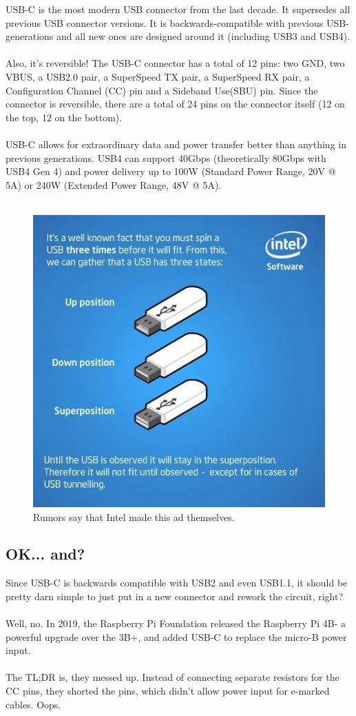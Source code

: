 \documentclass[12pt]{article}
\begin{document}
USB-C is the most modern USB connector from the last decade. It supersedes all previous USB connector versions. It is backwards-compatible with previous USB-generations and all new ones are designed around it (including USB3 and USB4). \\\\
\noindent
Also, it's reversible! The USB-C connector has a total of 12 pins: two GND, two VBUS, a USB2.0 pair, a SuperSpeed TX pair, a SuperSpeed RX pair, a Configuration Channel (CC) pin and a Sideband Use(SBU) pin. Since the connector is reversible, there are a total of 24 pins on the connector itself (12 on the top, 12 on the bottom). \\\\
\noindent
USB-C allows for extraordinary data and power transfer better than anything in previous generations. USB4 can support 40Gbps (theoretically 80Gbps with USB4 Gen 4) and power delivery up to 100W (Standard Power Range, 20V @ 5A) or 240W (Extended Power Range, 48V @ 5A).  \\\\
\begin{figure}[h]
	\centering
	\includegraphics[width=0.6\linewidth]{intel.jpg}
	\caption{Rumors say that Intel made this ad themselves.}
	\captionsetup{justification=raggedright,singlelinecheck=false}
	\label{fig:usbSuperposition}
\end{figure}


\subsection{OK... and?}
Since USB-C is backwards compatible with USB2 and even USB1.1, it should be pretty darn simple to just put in a new connector and rework the circuit, right?\\\\
\noindent
Well, no. In 2019, the Raspberry Pi Foundation released the Raspberry Pi 4B- a powerful upgrade over the 3B+, and added USB-C to replace the micro-B power input. \\\\
\noindent
The TL;DR is, they messed up. Instead of connecting separate resistors for the CC pins, they shorted the pins, which didn't allow power input for e-marked cables. Oops. 
\end{document}

